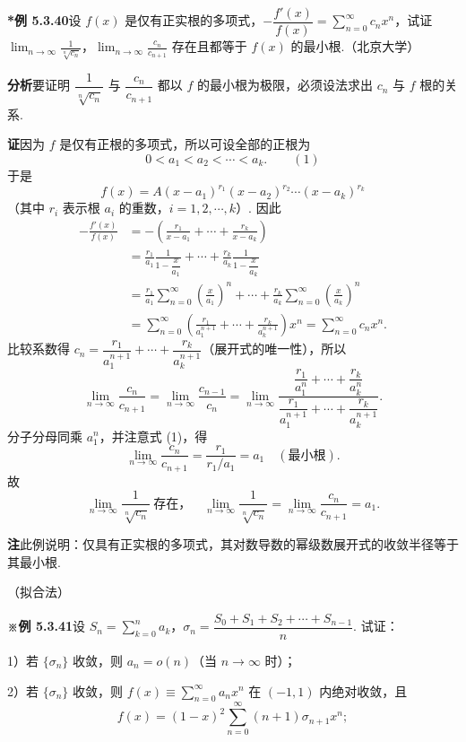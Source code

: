\documentclass[UTF8, 12pt, fontset=fandol, oneside]{ctexart}
\begin{document}
\noindent\textbf{*例 5.3.40}\quad 设 $f(x)$ 是仅有正实根的多项式，$-\dfrac{f'(x)}{f(x)}=\displaystyle\sum_{n=0}^{\infty}c_nx^n$，试证 $\displaystyle\lim_{n\to\infty}\frac1{\sqrt[n]{c_n}}$，$\displaystyle\lim_{n\to\infty}\frac{c_n}{c_{n+1}}$ 存在且都等于 $f(x)$ 的最小根.（北京大学）

\noindent\textbf{分析}\quad 要证明 $\dfrac1{\sqrt[n]{c_n}}$ 与 $\dfrac{c_n}{c_{n+1}}$ 都以 $f$ 的最小根为极限，必须设法求出 $c_n$ 与 $f$ 根的关系.

\noindent\textbf{证}\quad 因为 $f$ 是仅有正根的多项式，所以可设全部的正根为
\[
  0<a_1<a_2<\cdots<a_k. \qquad(1)
\]
于是
\[
  f(x)=A(x-a_1)^{r_1}(x-a_2)^{r_2}\cdots(x-a_k)^{r_k}
\]
（其中 $r_i$ 表示根 $a_i$ 的重数，$i=1,2,\cdots,k$）. 因此
\[
\begin{aligned}
-\frac{f'(x)}{f(x)}
&=-\left(\frac{r_1}{x-a_1}+\cdots+\frac{r_k}{x-a_k}\right)\\
&=\frac{r_1}{a_1}\frac1{1-\dfrac{x}{a_1}}+\cdots+
\frac{r_k}{a_k}\frac1{1-\dfrac{x}{a_k}}\\
&=\frac{r_1}{a_1}\sum_{n=0}^{\infty}\left(\frac{x}{a_1}\right)^n+\cdots+
\frac{r_k}{a_k}\sum_{n=0}^{\infty}\left(\frac{x}{a_k}\right)^n\\
&=\sum_{n=0}^{\infty}\left(\frac{r_1}{a_1^{n+1}}+\cdots+\frac{r_k}{a_k^{n+1}}\right)x^n
=\sum_{n=0}^{\infty}c_nx^n.
\end{aligned}
\]
比较系数得 $c_n=\dfrac{r_1}{a_1^{n+1}}+\cdots+\dfrac{r_k}{a_k^{n+1}}$（展开式的唯一性），所以
\[
  \lim_{n\to\infty}\frac{c_n}{c_{n+1}}
  =\lim_{n\to\infty}\frac{c_{n-1}}{c_n}
  =\lim_{n\to\infty}
  \frac{\dfrac{r_1}{a_1^n}+\cdots+\dfrac{r_k}{a_k^n}}
       {\dfrac{r_1}{a_1^{n+1}}+\cdots+\dfrac{r_k}{a_k^{n+1}}}.
\]
分子分母同乘 $a_1^n$，并注意式 (1)，得
\[
  \lim_{n\to\infty}\frac{c_n}{c_{n+1}}
  =\frac{r_1}{r_1/a_1}=a_1\quad(\text{最小根}).
\]
故
\[
  \lim_{n\to\infty}\frac1{\sqrt[n]{c_n}}
  \ \text{存在，}\quad
  \lim_{n\to\infty}\frac1{\sqrt[n]{c_n}}
  =\lim_{n\to\infty}\frac{c_n}{c_{n+1}}=a_1.
\]

\noindent\textbf{注}\quad 此例说明：仅具有正实根的多项式，其对数导数的幂级数展开式的收敛半径等于其最小根.

（拟合法）

\noindent\textbf{※例 5.3.41}\quad 设 $S_n=\displaystyle\sum_{k=0}^n a_k$，$\sigma_n=\dfrac{S_0+S_1+S_2+\cdots+S_{n-1}}{n}$. 试证：

1）若 $\{\sigma_n\}$ 收敛，则 $a_n=o(n)$（当 $n\to\infty$ 时）；

2）若 $\{\sigma_n\}$ 收敛，则 $f(x)\equiv\displaystyle\sum_{n=0}^{\infty}a_nx^n$ 在 $(-1,1)$ 内绝对收敛，且
\[
  f(x)=(1-x)^2\sum_{n=0}^{\infty}(n+1)\sigma_{n+1}x^n;
\]
\end{document}
